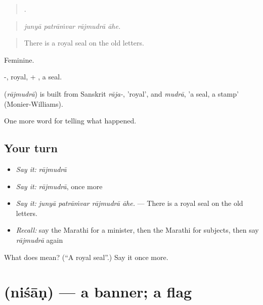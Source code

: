 \begin{quote}
   .
\end{quote}

\begin{quote}
\emph{junyā patrāṁvar rājmudrā āhe.}
\end{quote}

\begin{quote}
There is a royal seal on the old letters.
\end{quote}

Feminine.

-, royal, + , a seal.

\begin{cousinweb}
\textbf{} (\emph{rājmudrā}) is built from Sanskrit \emph{rāja-}, 'royal', and \emph{mudrā}, 'a seal, a stamp' (Monier-Williams).
\end{cousinweb}

\begin{grammarlens}[title={What you've built}]
One more word for telling what happened.
\end{grammarlens}

\subsection*{Your turn}
\begin{itemize}
\raggedright
  \item \emph{Say it:} \emph{rājmudrā}
  \item \emph{Say it:} \emph{rājmudrā}, once more
  \item \emph{Say it:} \emph{junyā patrāṁvar rājmudrā āhe.} — There is a royal seal on the old letters.
  \item \emph{Recall:} say the Marathi for a minister, then the Marathi for subjects, then say \emph{rājmudrā} again
\end{itemize}

\begin{tcolorbox}[breakable,colback=teal!4,colframe=teal!35!black,title={Before you move on}]
What does  mean? (\textquotedblleft{}A royal seal\textquotedblright{}.) Say it once more.
\end{tcolorbox}
\section[\texorpdfstring{\mr{निशाण} (niśāṇ)}{निशाण (niśāṇ)}]{ (niśāṇ) — a banner; a flag}

